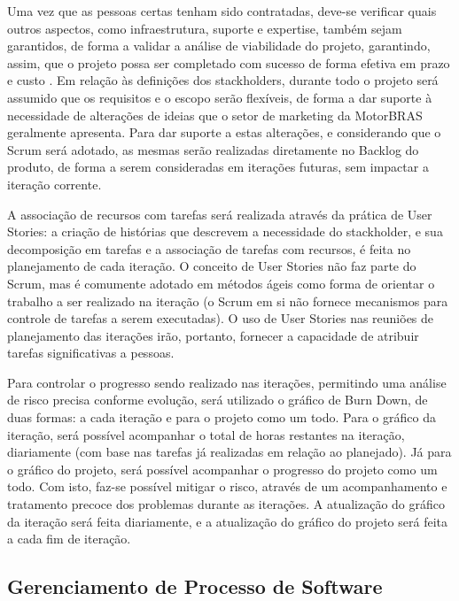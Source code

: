 \documentclass[12pt,journal,compsoc]{IEEEtran}
\begin{document}
Uma vez que as pessoas certas tenham sido contratadas, deve-se verificar quais outros aspectos, como infraestrutura, suporte e expertise, também sejam  garantidos, de forma a validar a análise de viabilidade do projeto, garantindo, assim, que o projeto possa ser completado com sucesso de forma efetiva em prazo e custo \cite{society_software_2004}. Em relação às definições dos stackholders, durante todo o projeto será assumido que os requisitos e o escopo serão flexíveis, de forma a dar suporte à necessidade de alterações de ideias que o setor de marketing da MotorBRAS geralmente apresenta. Para dar suporte a estas alterações, e considerando que o Scrum será adotado, as mesmas serão realizadas diretamente no Backlog do produto, de forma a serem consideradas em iterações futuras, sem impactar a iteração corrente. \cite{schwaber_scrum_2013}

A associação de recursos com tarefas será realizada através da prática de User Stories: a criação de histórias que descrevem a necessidade do stackholder, e sua decomposição em tarefas e a associação de tarefas com recursos, é feita no planejamento de cada iteração. O conceito de User Stories não faz parte do Scrum, mas é comumente adotado em métodos ágeis como forma de orientar o trabalho a ser realizado na iteração \cite{user_stories_applied} (o Scrum em si não fornece mecanismos para controle de tarefas a serem executadas). O uso de User Stories nas reuniões de planejamento das iterações irão, portanto, fornecer a capacidade de atribuir tarefas significativas a pessoas.

Para controlar o progresso sendo realizado nas iterações, permitindo uma análise de risco precisa conforme evolução, será utilizado o gráfico de Burn Down, de duas formas: a cada iteração e para o projeto como um todo. Para o gráfico da iteração, será possível acompanhar o total de horas restantes na iteração, diariamente (com base nas tarefas já realizadas em relação ao planejado). Já para o gráfico do projeto, será possível acompanhar o progresso do projeto como um todo. \cite{understanding_agile_scrum} Com isto, faz-se possível mitigar o risco, através de um acompanhamento e tratamento precoce dos problemas durante as iterações. A atualização do gráfico da iteração será feita diariamente, e a atualização do gráfico do projeto será feita a cada fim de iteração.


\subsection{Gerenciamento de Processo de Software}
\end{document}
